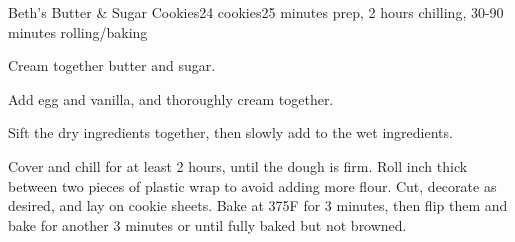 \documentclass[../Cookbook.tex]{subfiles}
\begin{document}
\begin{recipe}{Beth's Butter \& Sugar Cookies}{24 cookies}{25 minutes prep, 2 hours chilling, 30-90 minutes rolling/baking}

	Cream together butter and sugar.

	Add egg and vanilla, and thoroughly cream together.

	Sift the dry ingredients together, then slowly add to the wet ingredients.

	\newstep
	Cover and chill for at least 2 hours, until the dough is firm. Roll  inch thick between two pieces of plastic wrap to avoid adding more flour. Cut, decorate as desired, and lay on cookie sheets. Bake at 375\0F for
	3 minutes, then flip them and bake for another 3 minutes %
	or until fully baked but not browned.

\end{recipe}
\end{document}
